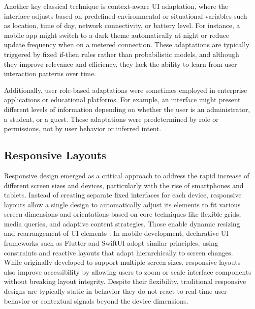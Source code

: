 \documentclass[openany]{book}
\begin{document}
Another key classical technique is context-aware UI adaptation, where the interface adjusts based on predefined environmental or situational variables such as location, time of day, network connectivity, or battery level. For instance, a mobile app might switch to a dark theme automatically at night or reduce update frequency when on a metered connection. These adaptations are typically triggered by fixed if-then rules rather than probabilistic models, and although they improve relevance and efficiency, they lack the ability to learn from user interaction patterns over time.

Additionally, user role-based adaptations were sometimes employed in enterprise applications or educational platforms. For example, an interface might present different levels of information depending on whether the user is an administrator, a student, or a guest. These adaptations were predetermined by role or permissions, not by user behavior or inferred intent.

\subsection{Responsive Layouts}
Responsive design emerged as a critical approach to address the rapid increase of different screen sizes and devices, particularly with the rise of smartphones and tablets. Instead of creating separate fixed interfaces for each device, responsive layouts allow a single design to automatically adjust its elements to fit various screen dimensions and orientations based on core techniques like flexible grids, media queries, and adaptive content strategies.  
Those enable dynamic resizing and rearrangement of UI elements \cite{Marcotte2010Responsive}. In mobile development, declarative UI frameworks such as Flutter and SwiftUI adopt similar principles, using constraints and reactive layouts that adapt hierarchically to screen changes.  
While originally developed to support multiple screen sizes, responsive layouts also improve accessibility by allowing users to zoom or scale interface components without breaking layout integrity. Despite their flexibility, traditional responsive designs are typically static in behavior they do not react to real-time user behavior or contextual signals beyond the device dimensions.
\end{document}
